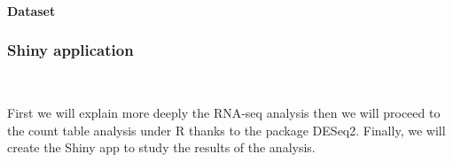 \documentclass[
]{article}
\begin{document}
\hypertarget{dataset}{%
\paragraph{Dataset}\label{dataset}}

\hypertarget{shiny-application}{%
\subsubsection{Shiny application}\label{shiny-application}}

~

First we will explain more deeply the RNA-seq analysis then we will
proceed to the count table analysis under R thanks to the package
DESeq2. Finally, we will create the Shiny app to study the results of
the analysis.
\end{document}
